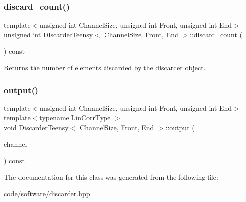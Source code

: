 \subsubsection{\texorpdfstring{discard\+\_\+count()}{discard\_count()}}
{\footnotesize\ttfamily template$<$unsigned int Channel\+Size, unsigned int Front, unsigned int End$>$ \\
unsigned int \hyperlink{classDiscarderTeensy}{Discarder\+Teensy}$<$ Channel\+Size, Front, End $>$\+::discard\+\_\+count (\begin{DoxyParamCaption}{ }\end{DoxyParamCaption}) const\hspace{0.3cm}{\ttfamily [inline]}}



Returns the number of elements discarded by the discarder object. 

\mbox{\label{classDiscarderTeensy_a16d1489169e9cfae817c350604141826}} 
\subsubsection{\texorpdfstring{output()}{output()}}
{\footnotesize\ttfamily template$<$unsigned int Channel\+Size, unsigned int Front, unsigned int End$>$ \\
template$<$typename Lin\+Corr\+Type $>$ \\
void \hyperlink{classDiscarderTeensy}{Discarder\+Teensy}$<$ Channel\+Size, Front, End $>$\+::output (\begin{DoxyParamCaption}\item[{const Lin\+Corr\+Type \&}]{channel }\end{DoxyParamCaption}) const\hspace{0.3cm}{\ttfamily [inline]}}



The documentation for this class was generated from the following file\+:\begin{DoxyCompactItemize}
\item 
code/software/\hyperlink{discarder_8hpp}{discarder.\+hpp}\end{DoxyCompactItemize}

